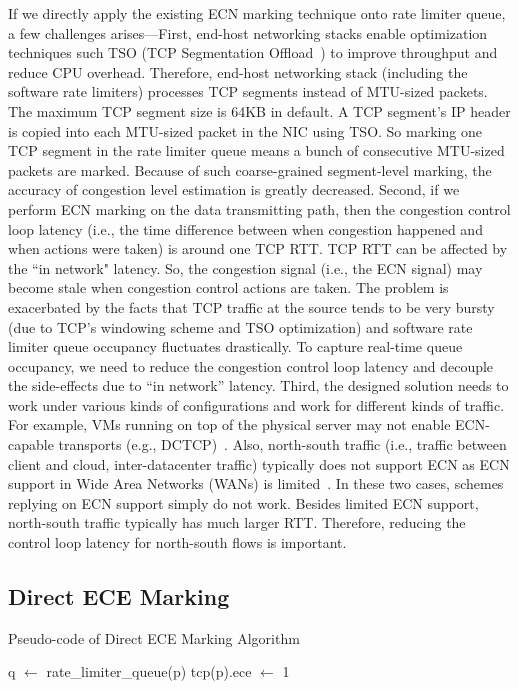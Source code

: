 If we directly apply the existing ECN marking technique onto rate limiter queue, a few 
challenges arises---First, end-host networking stacks enable optimization techniques 
such TSO (TCP Segmentation Offload~\cite{tcp-segment-offload}) to improve throughput and 
reduce CPU overhead. Therefore, end-host networking stack (including the software rate limiters) 
processes TCP segments instead of MTU-sized packets. 
The maximum TCP segment size is 64KB in default. A TCP segment's IP header is copied into 
each MTU-sized packet in the NIC using TSO.  So marking one TCP segment in the rate limiter 
queue means a bunch of consecutive MTU-sized packets are marked. Because of such coarse-grained segment-level marking, 
the accuracy of congestion level estimation is greatly decreased. 
Second, if we perform ECN marking on the data transmitting path, then the 
congestion control loop latency (i.e., the time difference between when congestion happened 
and when actions were taken) is around one TCP RTT. TCP RTT can be affected by the ``in network" latency. 
So, the congestion signal (i.e., the ECN signal) may become stale when congestion control actions are taken. 
The problem is exacerbated by the facts that TCP traffic at the source tends to be very 
bursty (due to TCP's windowing scheme and TSO optimization) and software rate limiter queue occupancy 
fluctuates drastically. To capture real-time queue occupancy, we need to reduce the congestion control 
loop latency and decouple the side-effects due to ``in network'' latency.  Third, the designed solution needs to 
work under various kinds of configurations and work for different kinds of traffic. For example, 
VMs running on top of the physical server may not enable ECN-capable transports 
(e.g., DCTCP)~\cite{he2016ac,cronkite2016virtualized}. Also, north-south traffic (i.e., traffic 
between client and cloud, inter-datacenter traffic) typically does not support ECN as ECN support 
in Wide Area Networks (WANs) is limited~\cite{kuhlewind2013state}. In these two cases, schemes replying 
on ECN support simply do not work. Besides limited ECN support, north-south traffic 
typically has much larger RTT. Therefore, reducing the control loop latency for north-south flows is important. 
\fi

\subsection{Direct ECE Marking}
\begin{algorithm}[t]
\caption{Pseudo-code of Direct ECE Marking Algorithm}
\label{alg:algorithm1}
\begin{algorithmic}[1]
\STATE q $\leftarrow$ rate\_limiter\_queue(p)
\STATE tcp(p).ece $\leftarrow$ 1
\ENDIF
\ENDFOR
\end{algorithmic}
\end{algorithm}

